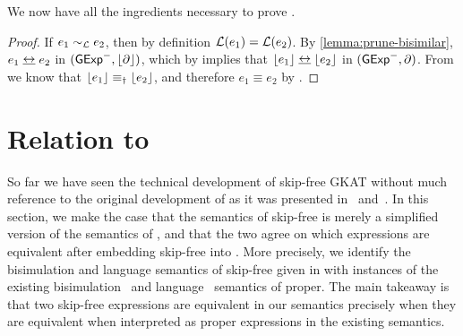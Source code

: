 \documentclass[orivec,envcountsect,envcountsame]{llncs}
\begin{document}
We now have all the ingredients necessary to prove .

\restatecompletenesstwo*
\begin{proof}
If \(e_1 \sim_{\mathcal{L}} e_2\), then by definition \(\mathcal{L}(e_1) = \mathcal{L}(e_2)\).
By \cref{lemma:prune-bisimilar}, \(e_1 \bisim e_2\) in \((\mathsf{GExp}^-, \lfloor\partial\rfloor)\), which by  implies that \(\floor{e_1} \bisim \floor{e_2}\) in \((\mathsf{GExp}^-, \partial)\).
From  we know that \(\lfloor e_1\rfloor \equiv_\dagger \lfloor e_2\rfloor\), and therefore \(e_1 \equiv e_2\) by .
\end{proof}

\section{Relation to  \GKAT}%
\label{sec:relation to GKAT}

So far we have seen the technical development of skip-free \textsf{GKAT} without much reference to the original development of \GKAT as it was presented in~\cite{gkatpopl} and~\cite{gkaticalp}.
In this section, we make the case that the semantics of skip-free \GKAT is merely a simplified version of the semantics of \GKAT, and that the two agree on which expressions are equivalent after embedding skip-free \GKAT into \GKAT. %
More precisely, we identify the bisimulation and language semantics of skip-free \GKAT given in  with instances of the existing bisimulation~\cite{gkaticalp} and language~\cite{gkatpopl} semantics of \GKAT proper.
The main takeaway is that two skip-free \GKAT expressions are equivalent in our semantics precisely when they are equivalent when interpreted as proper \GKAT expressions in the existing semantics.
\end{document}
